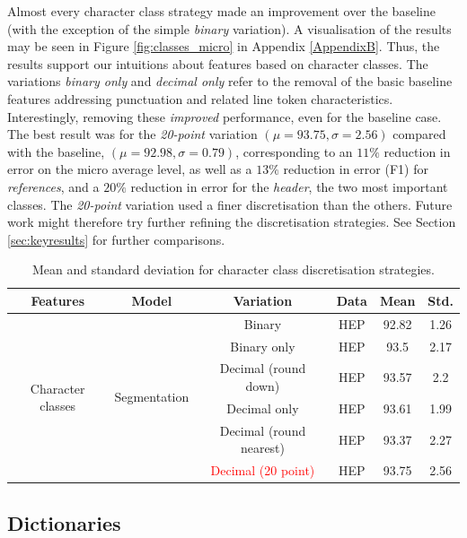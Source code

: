 Almost every character class strategy made an improvement over the baseline (with the exception of the simple \emph{binary} variation). A visualisation of the results may be seen in Figure \ref{fig:classes_micro} in Appendix \ref{AppendixB}. Thus, the results support our intuitions about features based on character classes. The variations \emph{binary only} and \emph{decimal only} refer to the removal of the basic baseline features addressing punctuation and related line token characteristics. Interestingly, removing these \emph{improved} performance, even for the baseline case. The best result was for the \emph{20-point} variation $(\mu = 93.75, \sigma = 2.56)$ compared with the baseline, $(\mu = 92.98, \sigma = 0.79)$, corresponding to an $11\%$ reduction in error on the micro average level, as well as a $13\%$ reduction in error (F1) for \emph{references}, and a $20\%$ reduction in error for the \emph{header}, the two most important classes. The \emph{20-point} variation used a finer discretisation than the others. Future work might therefore try further refining the discretisation strategies. See Section \ref{sec:keyresults} for further comparisons.

\begin{table}[h]
\begin{center}
\begin{tabular}{|c|c|c|c|c|c|}
\hline
Features & Model & Variation & Data & Mean & Std.\\
\hline
\multirow{6}{*}{Character classes} & \multirow{6}{*}{Segmentation} & Binary & HEP & 92.82 & 1.26\\\cline{3-6}
& & Binary only & HEP & 93.5 & 2.17\\\cline{3-6}
& & Decimal (round down) & HEP & 93.57 & 2.2\\\cline{3-6}
& & Decimal only & HEP & 93.61 & 1.99\\\cline{3-6}
& & Decimal (round nearest) & HEP & 93.37 & 2.27\\\cline{3-6}
& & \textcolor{red}{Decimal (20 point)} & HEP & 93.75 & 2.56\\\cline{3-6}
\hline
\end{tabular}
\caption[Mean and standard deviation for character class discretisation strategies.]{Mean and standard deviation for character class discretisation strategies.}
\label{table:characterclassresults}
\end{center}
\end{table}

\subsection{Dictionaries}

